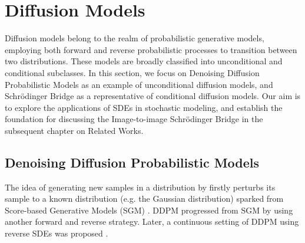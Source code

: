 \section{Diffusion Models}
\label{section:diffusion-models}

Diffusion models belong to the realm of probabilistic generative models, employing both forward and reverse probabilistic processes to transition between two distributions. These models are broadly classified into unconditional and conditional subclasses. In this section, we focus on Denoising Diffusion Probabilistic Models \cite{ho2020denoising} as an example of unconditional diffusion models, and Schrödinger Bridge as a representative of conditional diffusion models. Our aim is to explore the applications of SDEs in stochastic modeling, and establish the foundation for discussing the Image-to-image Schrödinger Bridge in the subsequent chapter on Related Works.

\subsection{Denoising Diffusion Probabilistic Models}
The idea of generating new samples in a distribution by firstly perturbs its sample to a known distribution (e.g. the Gaussian distribution) sparked from Score-based Generative Models (SGM) \cite{sohl2015deep}. DDPM progressed from SGM by using another forward and reverse strategy. Later, a continuous setting of DDPM using reverse SDEs was proposed \cite{song2020score}.

